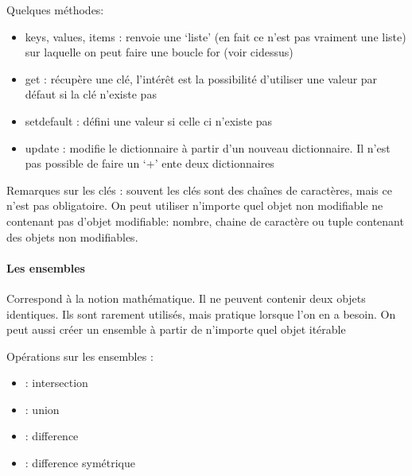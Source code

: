 \documentclass[letterpaper,10pt,english]{sphinxhowto}
\begin{document}
\sphinxAtStartPar
Quelques méthodes:
\begin{itemize}
\item {} 
\sphinxAtStartPar
keys, values, items : renvoie une ‘liste’ (en fait ce n’est pas vraiment une liste) sur laquelle on peut faire une boucle for (voir ci\sphinxhyphen{}dessus)

\item {} 
\sphinxAtStartPar
get : récupère une clé, l’intérêt est la possibilité d’utiliser une valeur par défaut si la clé n’existe pas

\item {} 
\sphinxAtStartPar
setdefault : défini une valeur si celle ci n’existe pas

\item {} 
\sphinxAtStartPar
update : modifie le dictionnaire à partir d’un nouveau dictionnaire. Il n’est pas possible de faire un ‘+’ ente deux dictionnaires

\end{itemize}

\sphinxAtStartPar
Remarques sur les clés : souvent les clés sont des chaînes de caractères, mais ce n’est pas obligatoire. On peut utiliser n’importe quel objet non modifiable ne contenant pas d’objet modifiable: nombre, chaine de caractère ou tuple contenant des objets non modifiables.


\paragraph{Les ensembles}
\label{\detokenize{cours3_conteneur_cours:les-ensembles}}
\sphinxAtStartPar
Correspond à la notion mathématique. Il ne peuvent contenir deux objets identiques. Ils sont rarement utilisés, mais pratique lorsque l’on en a besoin. On peut aussi créer un ensemble à partir de n’importe quel objet itérable

\begin{sphinxVerbatim}[commandchars=\\\{\}]
   
  
\end{sphinxVerbatim}

\sphinxAtStartPar
Opérations sur les ensembles :
\begin{itemize}
\item {} 
\sphinxAtStartPar
\sphinxcode{\sphinxupquote{\&}} : intersection

\item {} 
\sphinxAtStartPar
\sphinxcode{\sphinxupquote{|}} : union

\item {} 
\sphinxAtStartPar
\sphinxcode{\sphinxupquote{\sphinxhyphen{}}} : difference

\item {} 
\sphinxAtStartPar
\sphinxcode{\sphinxupquote{\textasciicircum{}}} : difference symétrique

\end{itemize}
\end{document}
